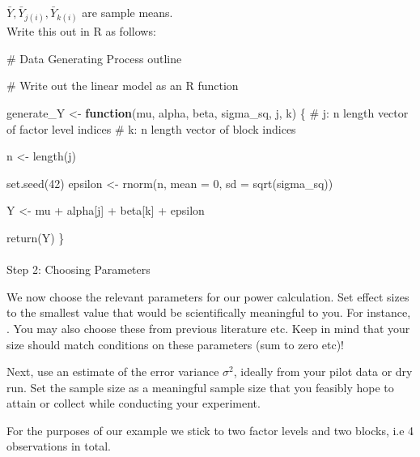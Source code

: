 \documentclass[
  letterpaper,
  DIV=11,
  numbers=noendperiod]{scrartcl}
\makeatletter
\let\oldparagraph\paragraph
\renewcommand{\paragraph}{
    \@ifstar
      \xxxParagraphStar
      \xxxParagraphNoStar
  }
\newcommand{\xxxParagraphStar}[1]{\oldparagraph*{#1}\mbox{}}
\newcommand{\xxxParagraphNoStar}[1]{\oldparagraph{#1}\mbox{}}
\newenvironment{Shaded}{\begin{snugshade}}{\end{snugshade}}
\newcommand{\AttributeTok}[1]{\textcolor[rgb]{0.40,0.45,0.13}{#1}}
\newcommand{\CommentTok}[1]{\textcolor[rgb]{0.37,0.37,0.37}{#1}}
\newcommand{\ControlFlowTok}[1]{\textcolor[rgb]{0.00,0.23,0.31}{\textbf{#1}}}
\newcommand{\DecValTok}[1]{\textcolor[rgb]{0.68,0.00,0.00}{#1}}
\newcommand{\FunctionTok}[1]{\textcolor[rgb]{0.28,0.35,0.67}{#1}}
\newcommand{\NormalTok}[1]{\textcolor[rgb]{0.00,0.23,0.31}{#1}}
\newcommand{\OtherTok}[1]{\textcolor[rgb]{0.00,0.23,0.31}{#1}}
\newcommand{\SpecialCharTok}[1]{\textcolor[rgb]{0.37,0.37,0.37}{#1}}
\makeatother
\begin{document}
\(\bar{Y}, \bar{Y}_{j(i)}, \bar{Y}_{k(i)}\) are sample means.\\

Write this out in R as follows:

\begin{Shaded}
\begin{Highlighting}[]
\CommentTok{\# Data Generating Process outline}

\CommentTok{\# Write out the linear model as an R function}

\NormalTok{generate\_Y }\OtherTok{\textless{}{-}} \ControlFlowTok{function}\NormalTok{(mu, alpha, beta, sigma\_sq, j, k) \{}
  \CommentTok{\# j: n length vector of factor level indices}
  \CommentTok{\# k: n length vector of block indices}
  
\NormalTok{  n }\OtherTok{\textless{}{-}} \FunctionTok{length}\NormalTok{(j)}
  
  \FunctionTok{set.seed}\NormalTok{(}\DecValTok{42}\NormalTok{)}
\NormalTok{  epsilon }\OtherTok{\textless{}{-}} \FunctionTok{rnorm}\NormalTok{(n, }\AttributeTok{mean =} \DecValTok{0}\NormalTok{, }\AttributeTok{sd =} \FunctionTok{sqrt}\NormalTok{(sigma\_sq))}
  
\NormalTok{  Y }\OtherTok{\textless{}{-}}\NormalTok{ mu }\SpecialCharTok{+}\NormalTok{ alpha[j] }\SpecialCharTok{+}\NormalTok{ beta[k] }\SpecialCharTok{+}\NormalTok{ epsilon}
  
  \FunctionTok{return}\NormalTok{(Y)}
\NormalTok{\}}
\end{Highlighting}
\end{Shaded}

\paragraph{Step 2: Choosing
Parameters}\label{step-2-choosing-parameters}

We now choose the relevant parameters for our power calculation. Set
effect sizes to the smallest value that would be scientifically
meaningful to you. For instance, . You may also choose these from
previous literature etc. Keep in mind that your size should match
conditions on these parameters (sum to zero etc)!

Next, use an estimate of the error variance \(\sigma^2\), ideally from
your pilot data or dry run. Set the sample size as a meaningful sample
size that you feasibly hope to attain or collect while conducting your
experiment.

For the purposes of our example we stick to two factor levels and two
blocks, i.e 4 observations in total.
\end{document}
